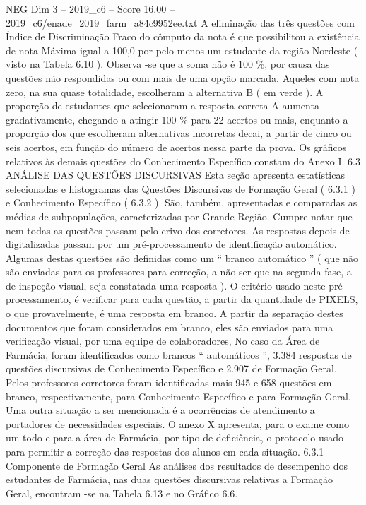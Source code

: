 \begin{textsample}{NEG Dim 3 – 2019\_c6 – Score 16.00 – 2019\_c6/enade\_2019\_farm\_a84c9952ee.txt}
A eliminação das três questões com Índice de Discriminação Fraco do cômputo da nota é que possibilitou a existência de nota Máxima igual a 100,0 por pelo menos um estudante da região Nordeste ( visto na Tabela 6.10 ).
Observa -se que a soma não é 100 \%, por causa das questões não respondidas ou com mais de uma opção marcada.
Aqueles com nota zero, na sua quase totalidade, escolheram a alternativa B ( em verde ).
A proporção de estudantes que selecionaram a resposta correta A aumenta gradativamente, chegando a atingir 100 \% para 22 acertos ou mais, enquanto a proporção dos que escolheram alternativas incorretas decai, a partir de cinco ou seis acertos, em função do número de acertos nessa parte da prova.
Os gráficos relativos às demais questões do Conhecimento Específico constam do Anexo I. 6.3 ANÁLISE DAS QUESTÕES DISCURSIVAS Esta seção apresenta estatísticas selecionadas e histogramas das Questões Discursivas de Formação Geral ( 6.3.1 ) e Conhecimento Específico ( 6.3.2 ).
São, também, apresentadas e comparadas as médias de subpopulações, caracterizadas por Grande Região.
Cumpre notar que nem todas as questões passam pelo crivo dos corretores.
As respostas depois de digitalizadas passam por um pré-processamento de identificação automático.
Algumas destas questões são definidas como um “ branco automático ” ( que não são enviadas para os professores para correção, a não ser que na segunda fase, a de inspeção visual, seja constatada uma resposta ).
O critério usado neste pré-processamento, é verificar para cada questão, a partir da quantidade de PIXELS, o que provavelmente, é uma resposta em branco.
A partir da separação destes documentos que foram considerados em branco, eles são enviados para uma verificação visual, por uma equipe de colaboradores, No caso da Área de Farmácia, foram identificados como brancos “ automáticos ”, 3.384 respostas de questões discursivas de Conhecimento Específico e 2.907 de Formação Geral.
Pelos professores corretores foram identificadas mais 945 e 658 questões em branco, respectivamente, para Conhecimento Específico e para Formação Geral.
Uma outra situação a ser mencionada é a ocorrências de atendimento a portadores de necessidades especiais.
O anexo X apresenta, para o exame como um todo e para a área de Farmácia, por tipo de deficiência, o protocolo usado para permitir a correção das respostas dos alunos em cada situação. 6.3.1 Componente de Formação Geral As análises dos resultados de desempenho dos estudantes de Farmácia, nas duas questões discursivas relativas a Formação Geral, encontram -se na Tabela 6.13 e no Gráfico 6.6.

\end{textsample}
